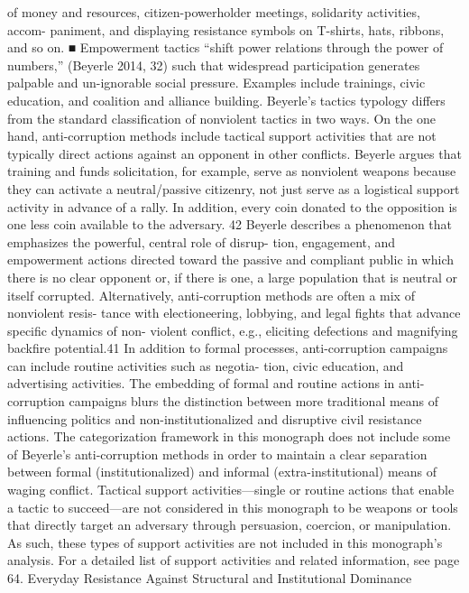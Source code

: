 \documentclass[twoside,a4paper,12pt,fleqn,openany]{extbook}
\begin{document}
of money and resources, citizen-powerholder meetings, solidarity activities, accom-
paniment, and displaying resistance symbols on T-shirts, hats, ribbons, and so on.
■
Empowerment tactics “shift power relations through the power of numbers,” (Beyerle
2014, 32) such that widespread participation generates palpable and un-ignorable
social pressure. Examples include trainings, civic education, and coalition and alliance
building.
Beyerle’s tactics typology differs from the standard classification of nonviolent tactics in
two ways. On the one hand, anti-corruption methods include tactical support activities that
are not typically direct actions against an opponent in other conflicts. Beyerle argues
that training and funds solicitation, for example, serve as nonviolent weapons because
they can activate a neutral/passive citizenry, not just serve as a logistical support activity in
advance of a rally. In addition, every coin donated to the opposition is one less coin available
to the adversary.
42
Beyerle describes a phenomenon that emphasizes the powerful, central role of disrup-
tion, engagement, and empowerment actions directed toward the passive and compliant
public in which there is no clear opponent or, if there is one, a large population that is neutral
or itself corrupted. Alternatively, anti-corruption methods are often a mix of nonviolent resis-
tance with electioneering, lobbying, and legal fights that advance specific dynamics of non-
violent conflict, e.g., eliciting defections and magnifying backfire potential.41 In addition to
formal processes, anti-corruption campaigns can include routine activities such as negotia-
tion, civic education, and advertising activities.
The embedding of formal and routine actions in anti-corruption campaigns blurs the
distinction between more traditional means of influencing politics and non-institutionalized
and disruptive civil resistance actions. The categorization framework in this monograph does
not include some of Beyerle’s anti-corruption methods in order to maintain a clear separation
between formal (institutionalized) and informal (extra-institutional) means of waging conflict.
Tactical support activities—single or routine actions that enable a tactic to succeed—are
not considered in this monograph to be weapons or tools that directly target an adversary
through persuasion, coercion, or manipulation. As such, these types of support activities are
not included in this monograph’s analysis. For a detailed list of support activities and related
information, see page 64.
Everyday Resistance Against Structural and Institutional Dominance
\end{document}
